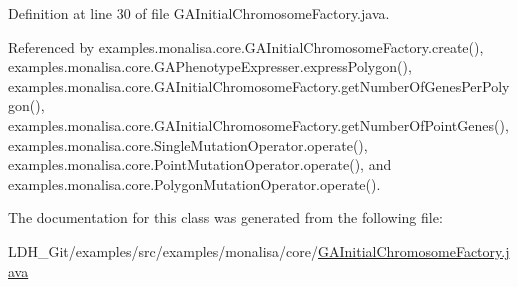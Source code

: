 Definition at line 30 of file G\-A\-Initial\-Chromosome\-Factory.\-java.



Referenced by examples.\-monalisa.\-core.\-G\-A\-Initial\-Chromosome\-Factory.\-create(), examples.\-monalisa.\-core.\-G\-A\-Phenotype\-Expresser.\-express\-Polygon(), examples.\-monalisa.\-core.\-G\-A\-Initial\-Chromosome\-Factory.\-get\-Number\-Of\-Genes\-Per\-Polygon(), examples.\-monalisa.\-core.\-G\-A\-Initial\-Chromosome\-Factory.\-get\-Number\-Of\-Point\-Genes(), examples.\-monalisa.\-core.\-Single\-Mutation\-Operator.\-operate(), examples.\-monalisa.\-core.\-Point\-Mutation\-Operator.\-operate(), and examples.\-monalisa.\-core.\-Polygon\-Mutation\-Operator.\-operate().



The documentation for this class was generated from the following file\-:\begin{DoxyCompactItemize}
\item 
L\-D\-H\-\_\-\-Git/examples/src/examples/monalisa/core/\hyperlink{_g_a_initial_chromosome_factory_8java}{G\-A\-Initial\-Chromosome\-Factory.\-java}\end{DoxyCompactItemize}
